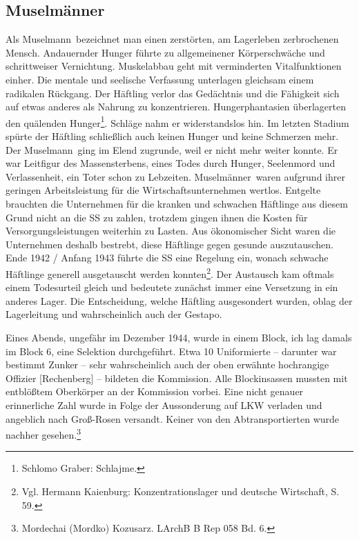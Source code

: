 \documentclass[a4paper,12pt,ngerman,
]{nisebook}
\begin{document}
\subsection{\glqq Muselmänner\grqq}
Als \glqq Muselmann\grqq~bezeichnet man einen zerstörten, am Lagerleben zerbrochenen Mensch. Andauernder Hunger führte zu allgemeinener Körperschwäche und schrittweiser Vernichtung. Muskelabbau geht mit verminderten Vitalfunktionen einher. Die mentale und seelische Verfassung unterlagen gleichsam einem radikalen Rückgang. Der Häftling verlor das Gedächtnis und die Fähigkeit sich auf etwas anderes als Nahrung zu konzentrieren. Hungerphantasien überlagerten den quälenden Hunger\footnote{Schlomo Graber: \glqq Schlajme\grqq.}. Schläge nahm er widerstandslos hin. Im letzten Stadium spürte der Häftling schließlich auch keinen Hunger und keine Schmerzen mehr. Der \glqq Muselmann\grqq~ging im Elend zugrunde, weil er nicht mehr weiter konnte. Er war Leitfigur des Massensterbens, eines Todes durch Hunger, Seelenmord und Verlassenheit, ein Toter schon zu Lebzeiten.
\newline
\glqq Muselmänner\grqq~waren aufgrund ihrer geringen Arbeitsleistung für die Wirtschaftsunternehmen wertlos. Entgelte brauchten die Unternehmen für die kranken und schwachen Häftlinge aus diesem Grund nicht an die SS zu zahlen, trotzdem gingen ihnen die Kosten für Versorgungsleistungen weiterhin zu Lasten. Aus ökonomischer Sicht waren die Unternehmen deshalb bestrebt, diese Häftlinge gegen gesunde auszutauschen. Ende 1942 / Anfang 1943 führte die SS eine Regelung ein, wonach schwache Häftlinge generell ausgetauscht werden konnten\footnote{Vgl. Hermann Kaienburg: Konzentrationslager und deutsche Wirtschaft, S. 59.}. Der Austausch kam oftmals einem Todesurteil gleich und bedeutete zunächst immer eine Versetzung in ein anderes Lager. Die Entscheidung, welche Häftling ausgesondert wurden, oblag der Lagerleitung und wahrscheinlich auch der Gestapo.
\begin{leftbar}
Eines Abends, ungefähr im Dezember 1944, wurde in einem Block, ich lag damals im Block 6, eine Selektion durchgeführt. Etwa 10 Uniformierte -- darunter war bestimmt Zunker -- sehr wahrscheinlich auch der oben erwähnte hochrangige Offizier [Rechenberg] -- bildeten die Kommission. Alle Blockinsassen mussten mit entblößtem Oberkörper an der Kommission vorbei. Eine nicht genauer erinnerliche Zahl wurde in Folge der Aussonderung auf LKW verladen und angeblich nach Groß-Rosen versandt. Keiner von den Abtransportierten wurde nachher gesehen.\footnote{Mordechai (Mordko) Kozusarz. LArchB B Rep 058 Bd. 6.}
\end{leftbar}
\end{document}
